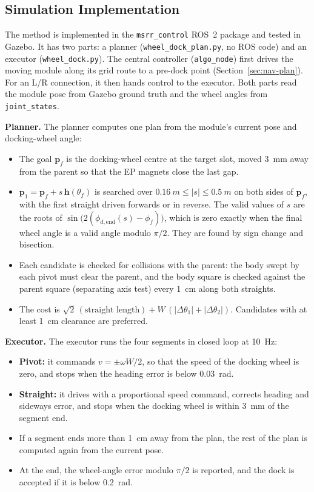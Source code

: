 \documentclass[12pt,a4paper]{article}
\begin{document}
\subsection{Simulation Implementation}

The method is implemented in the \texttt{msrr\_control} ROS~2 package and tested in Gazebo. It has two parts: a planner (\texttt{wheel\_dock\_plan.py}, no ROS code) and an executor (\texttt{wheel\_dock.py}). The central controller (\texttt{algo\_node}) first drives the moving module along its grid route to a pre-dock point (Section~\ref{sec:nav-plan}). For an L/R connection, it then hands control to the executor. Both parts read the module pose from Gazebo ground truth and the wheel angles from \texttt{joint\_states}.

\textbf{Planner.} The planner computes one plan from the module's current pose and docking-wheel angle:
\begin{itemize}[topsep=2pt,itemsep=2pt,parsep=0pt]
\item The goal $\mathbf{p}_f$ is the docking-wheel centre at the target slot, moved \SI{3}{mm} away from the parent so that the EP magnets close the last gap.
\item $\mathbf{p}_1 = \mathbf{p}_f + s\,\mathbf{h}(\theta_f)$ is searched over $\SI{0.16}{m} \le |s| \le \SI{0.5}{m}$ on both sides of $\mathbf{p}_f$, with the first straight driven forwards or in reverse. The valid values of $s$ are the roots of $\sin\!\big(2(\phi_{d,\mathrm{end}}(s) - \phi_f)\big)$, which is zero exactly when the final wheel angle is a valid angle modulo $\pi/2$. They are found by sign change and bisection.
\item Each candidate is checked for collisions with the parent: the body swept by each pivot must clear the parent, and the body square is checked against the parent square (separating axis test) every \SI{1}{cm} along both straights.
\item The cost is $\sqrt{2}\,(\text{straight length}) + W\,(|\Delta\theta_1| + |\Delta\theta_2|)$. Candidates with at least \SI{1}{cm} clearance are preferred.
\end{itemize}

\textbf{Executor.} The executor runs the four segments in closed loop at \SI{10}{Hz}:
\begin{itemize}[topsep=2pt,itemsep=2pt,parsep=0pt]
\item \textbf{Pivot:} it commands $v = \pm\omega W/2$, so that the speed of the docking wheel is zero, and stops when the heading error is below \SI{0.03}{rad}.
\item \textbf{Straight:} it drives with a proportional speed command, corrects heading and sideways error, and stops when the docking wheel is within \SI{3}{mm} of the segment end.
\item If a segment ends more than \SI{1}{cm} away from the plan, the rest of the plan is computed again from the current pose.
\item At the end, the wheel-angle error modulo $\pi/2$ is reported, and the dock is accepted if it is below \SI{0.2}{rad}.
\end{itemize}
\end{document}
